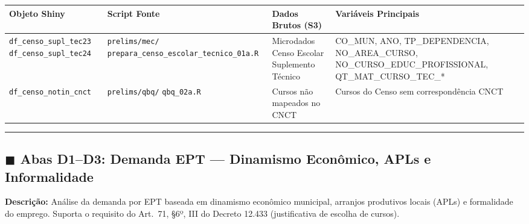 \documentclass[10pt]{article}
\begin{document}
	\begin{center}
		\small
		\begin{tabular}{p{3.5cm}p{4.5cm}p{5cm}p{9cm}}
			\toprule
			\textbf{Objeto Shiny} & \textbf{Script Fonte} & \textbf{Dados Brutos (S3)} & \textbf{Variáveis Principais} \\
			\midrule
			\texttt{df\_censo\_supl\_tec23} \newline \texttt{df\_censo\_supl\_tec24} & \texttt{prelims/mec/} \newline \texttt{prepara\_censo\_escolar\_tecnico\_01a.R} & Microdados Censo Escolar \newline Suplemento Técnico & CO\_MUN, ANO, TP\_DEPENDENCIA, NO\_AREA\_CURSO, NO\_CURSO\_EDUC\_PROFISSIONAL, QT\_MAT\_CURSO\_TEC\_* \\
			\texttt{df\_censo\_notin\_cnct} & \texttt{prelims/qbq/} \newline \texttt{qbq\_02a.R} & Cursos não mapeados no CNCT & Cursos do Censo sem correspondência CNCT \\
			\bottomrule
		\end{tabular}
	\end{center}
	
	\vspace{0.8em}
	\hrule
	\vspace{0.8em}
	
	\subsection*{\textcolor{tabD}{$\blacksquare$} Abas D1--D3: Demanda EPT --- Dinamismo Econômico, APLs e Informalidade}
	
	\noindent\textbf{Descrição:} Análise da demanda por EPT baseada em dinamismo econômico municipal, arranjos produtivos locais (APLs) e formalidade do emprego. Suporta o requisito do Art.\ 71, §6º, III do Decreto 12.433 (justificativa de escolha de cursos).
	
\end{document}
